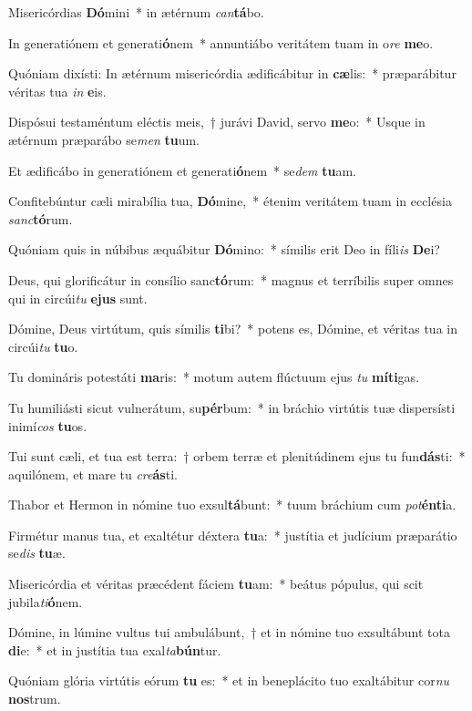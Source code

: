 \item Misericórdias \textbf{Dó}mini~* in ætérnum \textit{can}\textbf{tá}bo.
\item In generatiónem et generati\textbf{ó}nem~* annuntiábo veritátem tuam in o\textit{re} \textbf{me}o.
\item Quóniam dixísti: In ætérnum misericórdia ædificábitur in \textbf{cæ}lis:~* præparábitur véritas tua \textit{in} \textbf{e}is.
\item Dispósui testaméntum eléctis meis,~† jurávi David, servo \textbf{me}o:~* Usque in ætérnum præparábo se\textit{men} \textbf{tu}um.
\item Et ædificábo in generatiónem et generati\textbf{ó}nem~* se\textit{dem} \textbf{tu}am.
\item Confitebúntur cæli mirabília tua, \textbf{Dó}mine,~* étenim veritátem tuam in ecclésia \textit{sanc}\textbf{tó}rum.
\item Quóniam quis in núbibus æquábitur \textbf{Dó}mino:~* símilis erit Deo in fíli\textit{is} \textbf{De}i?
\item Deus, qui glorificátur in consílio sanc\textbf{tó}rum:~* magnus et terríbilis super omnes qui in circúi\textit{tu} \textbf{e}\textbf{jus} sunt.
\item Dómine, Deus virtútum, quis símilis \textbf{ti}bi?~* potens es, Dómine, et véritas tua in circúi\textit{tu} \textbf{tu}o.
\item Tu domináris potestáti \textbf{ma}ris:~* motum autem flúctuum ejus \textit{tu} \textbf{mí}\textbf{ti}gas.
\item Tu humiliásti sicut vulnerátum, su\textbf{pér}bum:~* in bráchio virtútis tuæ dispersísti inimí\textit{cos} \textbf{tu}os.
\item Tui sunt cæli, et tua est terra:~† orbem terræ et plenitúdinem ejus tu fun\textbf{dás}ti:~* aquilónem, et mare tu \textit{cre}\textbf{ás}ti.
\item Thabor et Hermon in nómine tuo exsul\textbf{tá}bunt:~* tuum bráchium cum \textit{pot}\textbf{én}\textbf{ti}a.
\item Firmétur manus tua, et exaltétur déxtera \textbf{tu}a:~* justítia et judícium præparátio se\textit{dis} \textbf{tu}æ.
\item Misericórdia et véritas præcédent fáciem \textbf{tu}am:~* beátus pópulus, qui scit jubila\textit{ti}\textbf{ó}nem.
\item Dómine, in lúmine vultus tui ambulábunt,~† et in nómine tuo exsultábunt tota \textbf{di}e:~* et in justítia tua exal\textit{ta}\textbf{bún}tur.
\item Quóniam glória virtútis eórum \textbf{tu} es:~* et in beneplácito tuo exaltábitur cor\textit{nu} \textbf{nos}trum.
